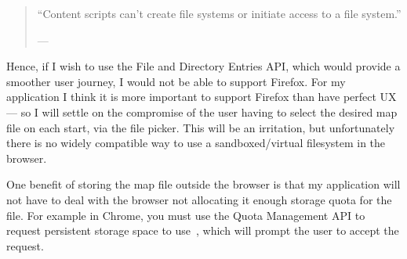 \documentclass[a4paper,12pt]{article} %
\begin{document}
\begin{quote}
    ``Content scripts can't create file systems or initiate access to a file system.''

    \footnotesize{--- }
\end{quote}

Hence, if I wish to use the File and Directory Entries API, which would provide a smoother user journey, I would not be able to support Firefox. For my application I think it is more important to support Firefox than have perfect UX --- so I will settle on the compromise of the user having to select the desired map file on each start, via the file picker. This will be an irritation, but unfortunately there is no widely compatible way to use a sandboxed/virtual filesystem in the browser.

One benefit of storing the map file outside the browser is that my application will not have to deal with the browser not allocating it enough storage quota for the file. For example in Chrome, you must use the Quota Management API to request persistent storage space to use~\cite{gd-offline-html5-storage}, which will prompt the user to accept the request.


\printbibliography{}
\end{document}

